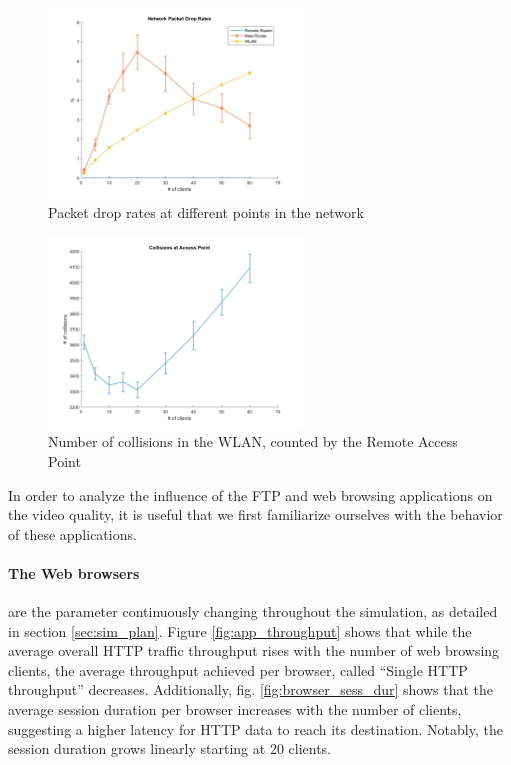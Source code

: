 \documentclass[
10pt, %
a4paper, %
oneside, %
headinclude,footinclude, %
BCOR5mm, %
]{scrartcl}
\begin{document}
\begin{figure}[!ht]
  \centering
  \includegraphics[width=0.6\textwidth]{Figures/nocctv/Network_Packet_Drop_Rates.png}
  \caption{Packet drop rates at different points in the network} \label{fig:net_drop}
\end{figure}
\begin{figure}[!ht]
  \centering
  \includegraphics[width=0.6\textwidth]{Figures/nocctv/Collisions_at_Access_Point.png}
  \caption{Number of collisions in the WLAN, counted by the Remote Access Point} \label{fig:rap_collisions}
\end{figure}

In order to analyze the influence of the FTP and web browsing applications on the video quality, it is useful that we first familiarize ourselves with the behavior of these applications.

\paragraph{The Web browsers} are the parameter continuously changing throughout the simulation, as detailed in section \ref{sec:sim_plan}. Figure \ref{fig:app_throughput} shows that while the average overall HTTP traffic throughput rises with the number of web browsing clients, the average throughput achieved per browser, called ``Single HTTP throughput'' decreases. Additionally, fig. \ref{fig:browser_sess_dur} shows that the average session duration per browser increases with the number of clients, suggesting a higher latency for HTTP data to reach its destination. Notably, the session duration grows linearly starting at 20 clients.
\end{document}
